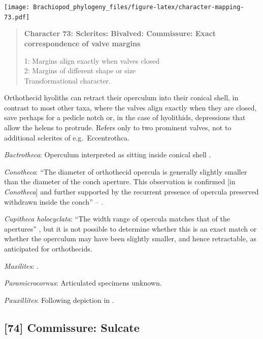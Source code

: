 \documentclass[openany]{book}
\begin{document}
\texttt{[image: Brachiopod\_phylogeny\_files/figure-latex/character-mapping-73.pdf]}

\begin{quote}
\textbf{Character 73: Sclerites: Bivalved: Commissure: Exact
correspondence of valve margins}

1: Margins align exactly when valves closed\\
2: Margins of different shape or size\\
Transformational character.
\end{quote}

Orthothecid hyoliths can retract their operculum into their conical
shell, in contrast to most other taxa, where the valves align exactly
when they are closed, save perhaps for a pedicle notch or, in the case
of hyolithids, depressions that allow the helens to protrude. Refers
only to two prominent valves, not to additional sclerites of
e.g.~Eccentrothca.

\hypertarget{Bactrotheca-coding-73}{}
\emph{Bactrotheca}: Operculum interpreted as sitting inside conical
shell \citep{Marek1976}.

\hypertarget{Conotheca-coding-73}{}
\emph{Conotheca}: ``The diameter of orthothecid opercula is generally
slightly smaller than the diameter of the conch aperture. This
observation is confirmed {[}in \emph{Conotheca}{]} and further supported
by the recurrent presence of opercula preserved withdrawn inside the
conch'' -- \citet{Devaere2014}.

\hypertarget{Cupitheca_holocyclata-coding-73}{}
\emph{Cupitheca holocyclata}: ``The width range of opercula matches that
of the apertures'' \citep{Sun2018}, but it is not possible to determine
whether this is an exact match or whether the operculum may have been
slightly smaller, and hence retractable, as anticipated for
orthothecids.

\hypertarget{Maxilites-coding-73}{}
\emph{Maxilites}: \citet{MartiMus2005}.

\hypertarget{Paramicrocornus-coding-73}{}
\emph{Paramicrocornus}: Articulated specimens unknown.

\hypertarget{Pauxillites-coding-73}{}
\emph{Pauxillites}: Following depiction in \citet{Marek1976}.

\subsection*{{[}74{]} Commissure: Sulcate}\label{commissure-sulcate}
\end{document}
